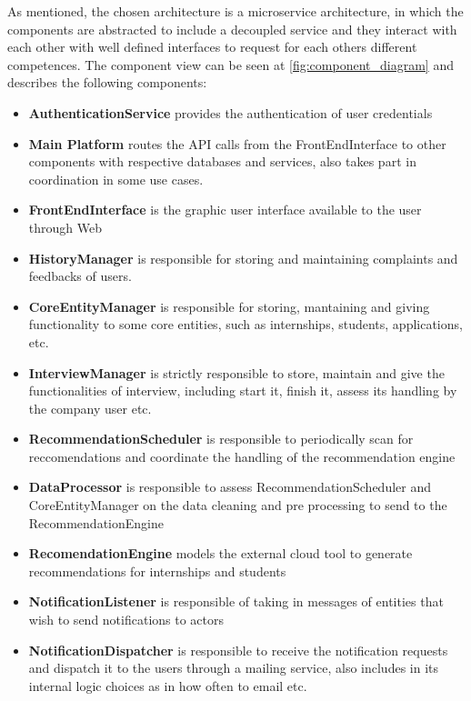 As mentioned, the chosen architecture is a microservice architecture, in which the components are abstracted to include a decoupled service and they interact with each other with well defined interfaces to request for each others different competences. The component view can be seen at \ref{fig:component_diagram} and describes the following components:
\begin{itemize}
    \item \textbf{AuthenticationService} provides the authentication of user credentials
    \item \textbf{Main Platform} routes the API calls from the FrontEndInterface to other components with respective databases and services, also takes part in coordination in some use cases.
    \item \textbf{FrontEndInterface} is the graphic user interface available to the user through Web
    \item \textbf{HistoryManager} is responsible for storing and maintaining complaints and feedbacks of users.
    \item \textbf{CoreEntityManager} is responsible for storing, mantaining and giving functionality to some core entities, such as internships, students, applications, etc.
    \item \textbf{InterviewManager} is strictly responsible to store, maintain and give the functionalities of interview, including start it, finish it, assess its handling by the company user etc.
    \item \textbf{RecommendationScheduler} is responsible to periodically scan for reccomendations and coordinate the handling of the recommendation engine
    \item \textbf{DataProcessor} is responsible to assess RecommendationScheduler and CoreEntityManager on the data cleaning and pre processing to send to the RecommendationEngine
    \item \textbf{RecomendationEngine} models the external cloud tool to generate recommendations for internships and students
    \item \textbf{NotificationListener} is responsible of taking in messages of entities that wish to send notifications to actors
    \item \textbf{NotificationDispatcher} is responsible to receive the notification requests and dispatch it to the users through a mailing service, also includes in its internal logic choices as in how often to email etc.

    
    
\end{itemize}

